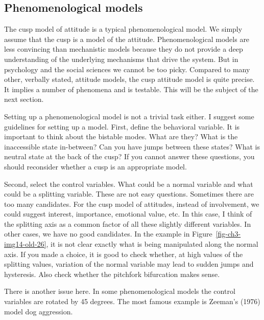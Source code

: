 \documentclass[
  a4paper,
  DIV=11,
  numbers=noendperiod]{scrreprt}
\begin{document}
\hypertarget{sec-Phenomenological-models}{%
\subsection{Phenomenological models}\label{sec-Phenomenological-models}}

The cusp model of attitude is a typical phenomenological model. We
simply assume that the cusp is a model of the attitude. Phenomenological
models are less convincing than mechanistic models because they do not
provide a deep understanding of the underlying mechanisms that drive the
system. But in psychology and the social sciences we cannot be too
picky. Compared to many other, verbally stated, attitude models, the
cusp attitude model is quite precise. It implies a number of phenomena
and is testable. This will be the subject of the next section.

Setting up a phenomenological model is not a trivial task either. I
suggest some guidelines for setting up a model. First, define the
behavioral variable. It is important to think about the bistable modes.
What are they? What is the inaccessible state in-between? Can you have
jumps between these states? What is neutral state at the back of the
cusp? If you cannot answer these questions, you should reconsider
whether a cusp is an appropriate model.

Second, select the control variables. What could be a normal variable
and what could be a splitting variable. These are not easy questions.
Sometimes there are too many candidates. For the cusp model of
attitudes, instead of involvement, we could suggest interest,
importance, emotional value, etc. In this case, I think of the splitting
axis as a common factor of all these slightly different variables. In
other cases, we have no good candidates. In the example in
Figure~\ref{fig-ch3-img14-old-26}, it is not clear exactly what is being
manipulated along the normal axis. If you made a choice, it is good to
check whether, at high values of the splitting values, variation of the
normal variable may lead to sudden jumps and hysteresis. Also check
whether the pitchfork bifurcation makes sense.

There is another issue here. In some phenomenological models the control
variables are rotated by 45 degrees. The most famous example is Zeeman's
(1976) model dog aggression.
\end{document}
